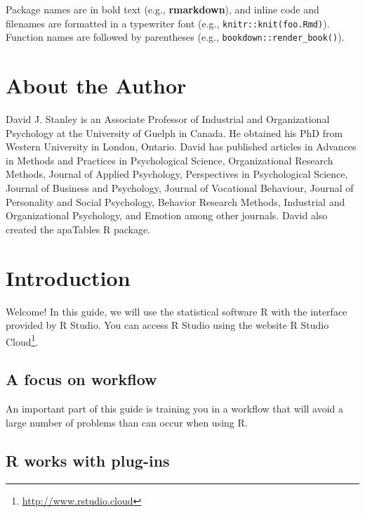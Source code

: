 \documentclass[
]{krantz}
\renewcommand{\href}[2]{#2\footnote{\url{#1}}}
\begin{document}
Package names are in bold text (e.g., \textbf{rmarkdown}), and inline code and filenames are formatted in a typewriter font (e.g., \texttt{knitr::knit(\textquotesingle{}foo.Rmd\textquotesingle{})}). Function names are followed by parentheses (e.g., \texttt{bookdown::render\_book()}).

\hypertarget{about-the-author}{%
\chapter*{About the Author}\label{about-the-author}}


David J. Stanley is an Associate Professor of Industrial and Organizational Psychology at the University of Guelph in Canada. He obtained his PhD from Western University in London, Ontario. David has published articles in Advances in Methods and Practices in Psychological Science, Organizational Research Methods, Journal of Applied Psychology, Perspectives in Psychological Science, Journal of Business and Psychology, Journal of Vocational Behaviour, Journal of Personality and Social Psychology, Behavior Research Methods, Industrial and Organizational Psychology, and Emotion among other journals. David also created the apaTables R package.

\mainmatter

\hypertarget{introduction}{%
\chapter{Introduction}\label{introduction}}

Welcome! In this guide, we will use the statistical software R with the interface provided by R Studio. You can access R Studio using the website \href{http://www.rstudio.cloud}{R Studio Cloud}.

\hypertarget{a-focus-on-workflow}{%
\section{A focus on workflow}\label{a-focus-on-workflow}}

An important part of this guide is training you in a workflow that will avoid a large number of problems than can occur when using R.

\hypertarget{r-works-with-plug-ins}{%
\section{R works with plug-ins}\label{r-works-with-plug-ins}}
\end{document}
